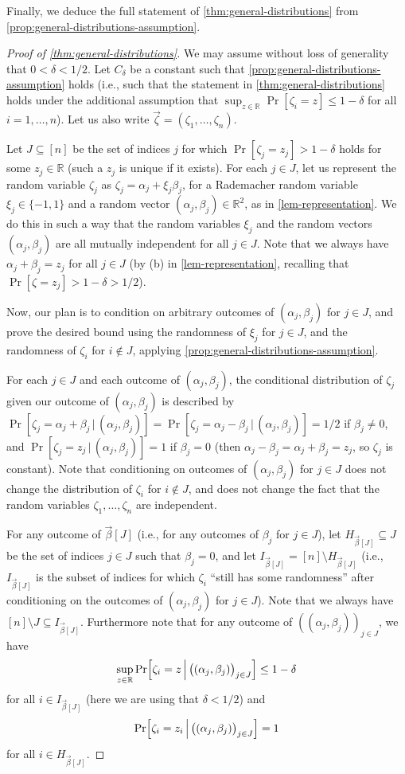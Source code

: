 \documentclass[english]{article}
\theoremstyle{remark}
\numberwithin{equation}{section}
\numberwithin{figure}{section}
\newcommand{\su}{\subseteq}
\newcommand{\RR}{\mathbb{R}}
\begin{document}
Finally, we deduce the full statement of \cref{thm:general-distributions} from \cref{prop:general-distributions-assumption}.
\begin{proof}[Proof of \cref{thm:general-distributions}]
    We may assume without loss of generality that $0<\delta<1/2$. Let   $C_\delta$ be a constant such that \cref{prop:general-distributions-assumption} holds (i.e., such that the statement in \cref{thm:general-distributions} holds under the additional assumption that $\sup_{z\in \RR}\Pr[\zeta_i=z]\le 1-\delta$ for all $i=1,\dots,n$). Let us also write $\vec \zeta=(\zeta_1,\dots,\zeta_n)$.
    
    Let $J\su [n]$ be the set of indices $j$ for which $\Pr[\zeta_j=z_j]> 1-\delta$ holds for some $z_j\in \RR$ (such a $z_j$ is unique if it exists). For each $j\in J$, let us represent the random variable $\zeta_j$ as $\zeta_j=\alpha_j+\xi_j \beta_j$, for a Rademacher random variable $\xi_j\in\{-1,1\}$ and a random vector $(\alpha_j,\beta_j)\in \RR^2$, as in \cref{lem-representation}. We do this in such a way that the random variables $\xi_j$ and the random vectors  $(\alpha_j,\beta_j)$ are all mutually independent for all $j\in J$. Note that we always have $\alpha_j+\beta_j=z_j$ for all $j\in J$ (by (b) in \cref{lem-representation}, recalling that $\Pr[\zeta=z_j]> 1-\delta>1/2$).

Now, our plan is to condition on arbitrary outcomes of $(\alpha_j,\beta_j)$ for $j\in J$, and prove the desired bound using the randomness of $\xi_j$ for $j\in J$, and the randomness of $\zeta_i$ for $i\notin J$, applying \cref{prop:general-distributions-assumption}.

For each $j\in J$ and each outcome of $(\alpha_j,\beta_j)$, the conditional distribution of $\zeta_j$ given our outcome of $(\alpha_j,\beta_j)$ is described by $\Pr[\zeta_j=\alpha_j+\beta_j\,|\,(\alpha_j,\beta_j)]=\Pr[\zeta_j=\alpha_j-\beta_j\,|\,(\alpha_j,\beta_j)]=1/2$ if $\beta_j\ne 0$, and
$\Pr[\zeta_j=z_j\,|\,(\alpha_j,\beta_j)]=1$  if $\beta_j=0$ (then $\alpha_j-\beta_j=\alpha_j+\beta_j=z_j$, so $\zeta_j$ is constant).
Note that conditioning on outcomes of $(\alpha_j,\beta_j)$ for $j\in J$ does not change the distribution of $\zeta_i$ for $i\notin J$, and does not change the fact that the random variables $\zeta_1,\dots,\zeta_n$ are independent.

For any outcome of $\vec \beta[J]$ (i.e., for any outcomes of $\beta_j$ for $j\in J$), let $H_{\vec \beta[J]}\su J$ be the set of indices $j\in J$ such that $\beta_j=0$, and let $I_{\vec \beta[J]}=[n]\setminus H_{\vec \beta[J]}$ (i.e., $I_{\vec \beta[J]}$ is the subset of indices for which $\zeta_i$ ``still has some randomness'' after conditioning on the outcomes of $(\alpha_j,\beta_j)$ for $j\in J$). Note that we always have $[n]\setminus J\su I_{\vec \beta[J]}$. Furthermore note that for any outcome of $((\alpha_j,\beta_j))_{j\in J}$, we have
\[\sup_{z\in \RR}\Pr\Bigl[\zeta_i=z\,\Big|\,\bigl((\alpha_j,\beta_j)\bigr)_{j\in J}\Bigr]\le 1-\delta\]
for all $i\in I_{\vec \beta[J]}$ (here we are using that $\delta<1/2$) and
\[\Pr\Bigl[\zeta_i=z_i\,\Big|\,\bigl((\alpha_j,\beta_j)\bigr)_{j\in J}\Bigr]=1\]
for all $i\in H_{\vec \beta[J]}$.


\end{proof}
\end{document}
